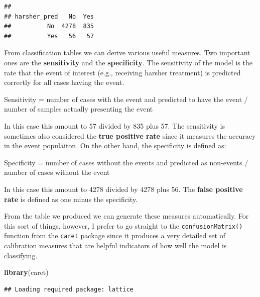 \documentclass[]{book}
\newenvironment{Shaded}{\begin{snugshade}}{\end{snugshade}}
\newcommand{\CommentTok}[1]{\textcolor[rgb]{0.56,0.35,0.01}{\textit{#1}}}
\newcommand{\KeywordTok}[1]{\textcolor[rgb]{0.13,0.29,0.53}{\textbf{#1}}}
\newcommand{\NormalTok}[1]{#1}
\newcommand{\OperatorTok}[1]{\textcolor[rgb]{0.81,0.36,0.00}{\textbf{#1}}}
\newcommand{\StringTok}[1]{\textcolor[rgb]{0.31,0.60,0.02}{#1}}
\theoremstyle{definition}
\theoremstyle{definition}
\theoremstyle{definition}
\theoremstyle{remark}
\begin{document}
\begin{Shaded}
\end{Shaded}

\begin{verbatim}
##             
## harsher_pred   No  Yes
##          No  4278  835
##          Yes   56   57
\end{verbatim}

From classification tables we can derive various useful measures. Two
important ones are the \textbf{sensitivity} and the
\textbf{specificity}. The sensitivity of the model is the rate that the
event of interest (e.g., receiving harsher treatment) is predicted
correctly for all cases having the event.

Sensitivity = number of cases with the event and predicted to have the
event / number of samples actually presenting the event

In this case this amount to 57 divided by 835 plus 57. The sensitivity
is sometimes also considered the \textbf{true positive rate} since it
measures the accuracy in the event populaiton. On the other hand, the
specificity is defined as:

Specificity = number of cases without the events and predicted as
non-events / number of cases without the event

In this case this amount to 4278 divided by 4278 plus 56. The
\textbf{false positive rate} is defined as one minus the specificity.

From the table we produced we can generate these measures automatically.
For this sort of things, however, I prefer to go straight to the
\texttt{confusionMatrix()} function from the \texttt{caret} package
since it produces a very detailed set of calibration measures that are
helpful indicators of how well the model is classifying.

\begin{Shaded}
\begin{Highlighting}[]
\KeywordTok{library}\NormalTok{(caret)}
\end{Highlighting}
\end{Shaded}

\begin{verbatim}
## Loading required package: lattice
\end{verbatim}
\end{document}
